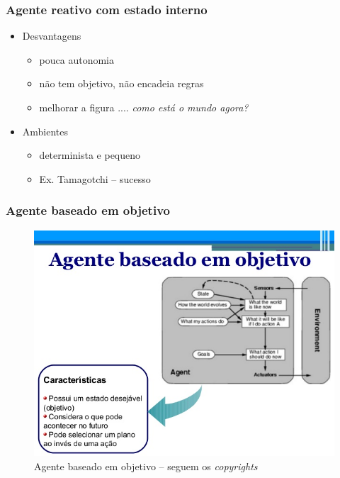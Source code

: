 
\begin{frame} %

    \frametitle{Agente reativo com estado interno}

\begin{itemize}
  \item Desvantagens
  \begin{itemize}
    \item pouca autonomia

   \item não tem objetivo, não encadeia regras
   
   \item melhorar a figura .... \textit{como está o mundo agora?}
  \end{itemize}
  
  \item Ambientes
\begin{itemize}
  \item determinista e pequeno 
  \item Ex. Tamagotchi -- sucesso 
\end{itemize}
  
\end{itemize}
\end{frame}


\begin{frame} %

 \frametitle{Agente baseado em objetivo}

\begin{figure}[!ht]
  \centering
  \includegraphics[height =.7\textheight,width=.7\textwidth]
  {figuras/agente_baseado_em_objetivo.jpg}
  \caption{Agente baseado em objetivo -- seguem os \textit{copyrights}}
\end{figure}

\end{frame}



